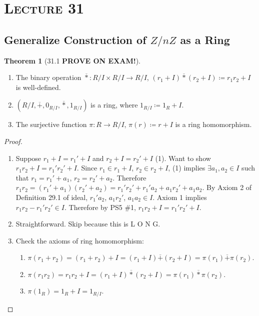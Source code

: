 \documentclass{article}
\newcommand{\coleq}{\coloneqq}
\newcommand{\func}[3]{#1: #2 \to #3}
\theoremstyle{definition}
\newtheorem*{thm}{Theorem}
\theoremstyle{remark}
\begin{document}
    \section*{\textbf{\textsc{Lecture 31}}}{
        \subsection*{Generalize Construction of $Z/nZ$ as a Ring}{
            \begin{thm}[31.1 \textbf{PROVE ON EXAM!}]\hfill
                \begin{enumerate}
                    \item The binary operation $\func{\overline{*}}{R/I\times R/I}{R/I}$, $(r_1+I)\overline{*}(r_2+I)\coleq r_1r_2+I$ is well-defined.
                    \item $(R/I,\overline{+},0_{R/I},\overline{*},1_{R/I})$ is a ring, where $1_{R/I}\coleq 1_R+I$.
                    \item The surjective function $\func{\pi}{R}{R/I}$, $\pi(r)\coleq r+I$ is a ring homomorphism.
                \end{enumerate}
            \end{thm}
            
            \begin{proof}
                \begin{enumerate}
                    \item Suppose $r_1+I=r_1'+I$ and $r_2+I=r_2'+I$ (1). Want to show $r_1r_2+I=r_1'r_2'+I$. Since $r_1 \in r_1 + I$, $r_2 \in r_2+I$, (1) implies $\exists a_1,a_2 \in I$ such that $r_1=r_1'+a_1$, $r_2=r_2'+a_2$. Therefore $r_1r_2=(r_1'+a_1)(r_2'+a_2)=r_1'r_2'+r_1'a_2+a_1r_2'+a_1a_2$. By Axiom 2 of Definition 29.1 of ideal, $r_1'a_2$, $a_1r_2'$, $a_1a_2 \in I$. Axiom 1 implies $r_1r_2-r_1'r_2' \in I$. Therefore by PS5 \#1, $r_1r_2+I=r_1'r_2'+I$.
                    \item Straightforward. Skip because this is L O N G.
                    \item Check the axioms of ring homomorphism:
                    \begin{enumerate}
                        \item $\pi(r_1+r_2)=(r_1+r_2)+I=(r_1+I)\overline{+}(r_2+I)=\pi(r_1)\overline{+}\pi(r_2)$.
                        \item $\pi(r_1r_2)=r_1r_2+I=(r_1+I)\overline{*}(r_2+I)=\pi(r_1)\overline{*}\pi(r_2)$.
                        \item $\pi(1_R)=1_R+I=1_{R/I}$.
                    \end{enumerate}
                \end{enumerate}
            \end{proof}
            
}}
\end{document}
